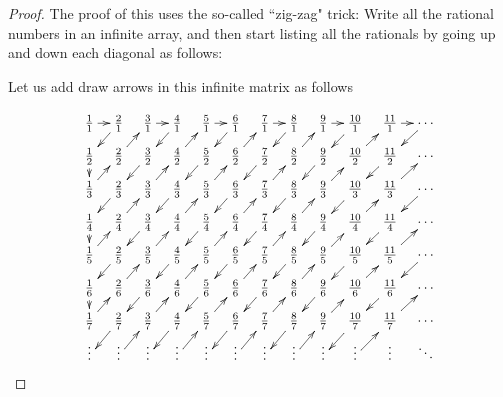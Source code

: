 \documentclass[11pt,dvipsnames]{book}
\numberwithin{equation}{section} %
\numberwithin{figure}{section} %
\numberwithin{table}{section} %
\begin{document}
\begin{proof}
The proof of this uses the so-called ``zig-zag" trick: Write all the rational numbers in an infinite array, and then start listing all the rationals by going up and down each diagonal as follows:


 Let us add draw arrows in this infinite matrix as
follows

$$\xymatrixrowsep{0.2cm}
\xymatrixcolsep{0.3cm}\xymatrix{
&\frac{1}{1}\ar@{->}[r] &\frac{2}{1}\ar@{->}[dl]&\frac{3}{1}\ar@{->}[r] &\frac{4}{1}\ar@{->}[dl]&\frac{5}{1}\ar@{->}[r] & \frac{6}{1}\ar@{->}[dl]& \frac{7}{1}\ar@{->}[r] & \frac{8}{1}\ar@{->}[dl]& \frac{9}{1}\ar@{->}[r] & \frac{10}{1}\ar@{->}[dl]& \frac{11}{1}\ar@{->}[r] &\cdots\ar@{->}[dl]&\\
&\frac{1}{2}\ar@{->}[d] &\frac{2}{2}\ar@{->}[ur]&\frac{3}{2}\ar@{->}[dl]&\frac{4}{2}\ar@{->}[ur]&\frac{5}{2}\ar@{->}[dl]& \frac{6}{2}\ar@{->}[ur]& \frac{7}{2}\ar@{->}[dl]& \frac{8}{2}\ar@{->}[ur]& \frac{9}{2}\ar@{->}[dl]& \frac{10}{2}\ar@{->}[ur]& \frac{11}{2}\ar@{->}[dl]&\cdots &\\
&\frac{1}{3}\ar@{->}[ur]&\frac{2}{3}\ar@{->}[dl]&\frac{3}{3}\ar@{->}[ur]&\frac{4}{3}\ar@{->}[dl]&\frac{5}{3}\ar@{->}[ur]& \frac{6}{3}\ar@{->}[dl]& \frac{7}{3}\ar@{->}[ur]& \frac{8}{3}\ar@{->}[dl]& \frac{9}{3}\ar@{->}[ur]& \frac{10}{3}\ar@{->}[dl]& \frac{11}{3}\ar@{->}[ur]&\cdots\ar@{->}[dl] &\\
&\frac{1}{4}\ar@{->}[d] &\frac{2}{4}\ar@{->}[ur]&\frac{3}{4}\ar@{->}[dl]&\frac{4}{4}\ar@{->}[ur]&\frac{5}{4}\ar@{->}[dl]& \frac{6}{4}\ar@{->}[ur]& \frac{7}{4}\ar@{->}[dl]& \frac{8}{4}\ar@{->}[ur]& \frac{9}{4}\ar@{->}[dl]& \frac{10}{4}\ar@{->}[ur]& \frac{11}{4}\ar@{->}[dl]&\cdots &\\
&\frac{1}{5}\ar@{->}[ur]&\frac{2}{5}\ar@{->}[dl]&\frac{3}{5}\ar@{->}[ur]&\frac{4}{5}\ar@{->}[dl]&\frac{5}{5}\ar@{->}[ur]& \frac{6}{5}\ar@{->}[dl]& \frac{7}{5}\ar@{->}[ur]& \frac{8}{5}\ar@{->}[dl]& \frac{9}{5}\ar@{->}[ur]& \frac{10}{5}\ar@{->}[dl]& \frac{11}{5}\ar@{->}[ur]&\cdots\ar@{->}[dl]&\\
&\frac{1}{6}\ar@{->}[d] &\frac{2}{6}\ar@{->}[ur]&\frac{3}{6}\ar@{->}[dl]&\frac{4}{6}\ar@{->}[ur]&\frac{5}{6}\ar@{->}[dl]& \frac{6}{6}\ar@{->}[ur]& \frac{7}{6}\ar@{->}[dl]& \frac{8}{6}\ar@{->}[ur]& \frac{9}{6}\ar@{->}[dl]& \frac{10}{6}\ar@{->}[ur]& \frac{11}{6}\ar@{->}[dl]&\cdots &\\
&\frac{1}{7}\ar@{->}[ur]&\frac{2}{7}\ar@{->}[dl]&\frac{3}{7}\ar@{->}[ur]&\frac{4}{7}\ar@{->}[dl]&\frac{5}{7}\ar@{->}[ur]& \frac{6}{7}\ar@{->}[dl]& \frac{7}{7}\ar@{->}[ur]& \frac{8}{7}\ar@{->}[dl]& \frac{9}{7}\ar@{->}[ur]& \frac{10}{7}\ar@{->}[dl]& \frac{11}{7}\ar@{->}[ur]&\cdots &\\
& \vdots                & \vdots\ar@{->}[ur]    &    \vdots             & \vdots \ar@{->}[ur]   &   \vdots              &   \vdots\ar@{->}[ur]   &   \vdots               &   \vdots\ar@{->}[ur]   &   \vdots               &   \vdots\ar@{->}[ur]    &   \vdots    & \ddots &}%
$$




\end{proof}
\end{document}
